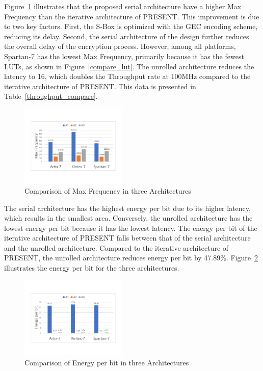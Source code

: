 \documentclass[final,5p,times,twocolumn]{elsarticle}
\begin{document}
Figure~\ref{compare-maxF} illustrates that the proposed serial architecture have a higher Max Frequency than the iterative architecture of PRESENT. This improvement is due to two key factors. First, the S-Box is optimized with the GEC encoding scheme, reducing its delay. Second, the serial architecture of the design further reduces the overall delay of the encryption process. However, among all platforms, Spartan-7 has the lowest Max Frequency, primarily because it has the fewest LUTs, as shown in Figure~\ref{compare_lut}. The unrolled architecture reduces the latency to 16, which doubles the Throughput rate at 100MHz compared to the iterative architecture of PRESENT. This data is presented in Table~\ref{throughput_compare}.

\begin{figure}
    \centering
    \includegraphics[width=0.45\textwidth]{./fig/compare-maxf.pdf}
    \caption{Comparison of Max Frequency in three Architectures}\label{compare-maxF}
\end{figure}

The serial architecture has the highest energy per bit due to its higher latency, which results in the smallest area. Conversely, the unrolled architecture has the lowest energy per bit because it has the lowest latency. The energy per bit of the iterative architecture of PRESENT falls between that of the serial architecture and the unrolled architecture. Compared to the iterative architecture of PRESENT, the unrolled architecture reduces energy per bit by 47.89\%. Figure~\ref{compare-energy} illustrates the energy per bit for the three architectures.

\begin{figure}
    \centering
    \includegraphics[width=0.45\textwidth]{./fig/compare-energy.pdf}
    \caption{Comparison of Energy per bit in three Architectures}\label{compare-energy}
\end{figure}
\end{document}
